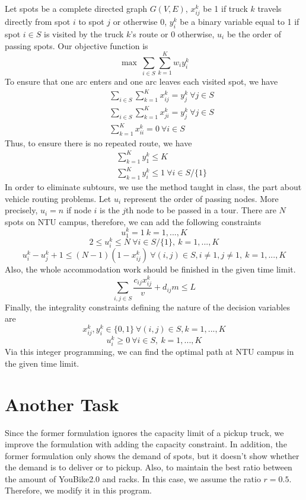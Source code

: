 \documentclass[12pt,a4paper]{article}
\begin{document}
Let spots be a complete directed graph $G(V,E)$, $x_{ij}^k$ be 1 if truck $k$ travels directly from spot $i$ to spot $j$ or otherwise 0, $y_i^k$ be a binary variable equal to 1 if spot $i \in S$ is visited by the truck $k$'s route or 0 otherwise, $u_i$ be the order of passing spots. Our objective function is
\[
\max \ \sum_{i \in S}\sum_{k=1}^K w_iy_i^k
\]
To ensure that one arc enters and one arc leaves each visited spot, we have
\[\begin{split}
    \quad & \sum_{i \in S} \sum_{k=1}^K x_{ij}^k = y_j^k \ \forall j \in S \\
    \quad & \sum_{i \in S} \sum_{k=1}^K x_{ji}^k = y_j^k \ \forall j \in S \\
    \quad & \sum_{k=1}^Kx_{ii}^k = 0 \ \forall i \in S
\end{split}\]
Thus, to ensure there is no repeated route, we have
\[\begin{split}
    \quad & \sum_{k=1}^K y_1^k \leq K \\
    \quad & \sum_{k=1}^K y_i^k \leq 1 \ \forall i \in S/\{1\}
\end{split}\]
In order to eliminate subtours, we use the method taught in class, the part about vehicle routing problems. Let $u_i$ represent the order of passing nodes. More precisely, $u_i=n$ if node $i$ is the $j$th node to be passed in a tour. There are $N$ spots on NTU campus, therefore, we can add the following constraints
\[
u_1^k = 1 \ k = 1,...,K
\]
\[
2 \leq u_i^k \leq N \ \forall i \in S/\{1\}, \  k = 1,...,K
\]
\[
u_i^k-u_j^k+1 \leq (N-1)(1-x_{ij}^k) \ \forall(i,j) \in S,i \neq 1,j \neq 1, \  k = 1,...,K
\]
Also, the whole accommodation work should be finished in the given time limit.
\[
\sum_{i,j \in S} \frac{c_{ij}x_{ij}^k}{v} + d_{ij} m \leq L
\]
Finally, the integrality constraints defining the nature of the decision variables are
\[
    x_{ij}^k, y_{i}^k \in \{0,1\} \  \forall (i,j) \in S, k=1,...,K
\]
\[
    u_i^k \geq 0 \ \forall i \in S, \ k=1,...,K
\]
Via this integer programming, we can find the optimal path at NTU campus in the given time limit.




\section{Another Task}
Since the former formulation ignores the capacity limit of a pickup truck, we improve the formulation with adding the capacity constraint. In addition, the former formulation only shows the demand of spots, but it doesn't show whether the demand is to deliver or to pickup. Also, to maintain the best ratio between the amount of YouBike2.0 and racks. In this case, we assume the ratio $r=0.5$. Therefore, we modify it in this program.
\end{document}
